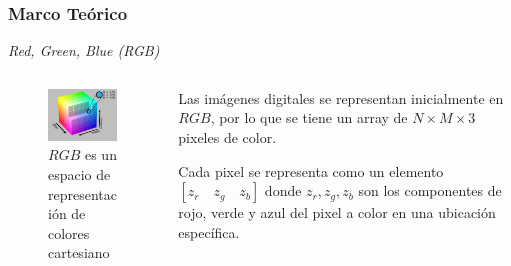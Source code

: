 \documentclass[usenames,dvipsnames]{beamer}
\begin{document}



\begin{frame} 
\frametitle{Marco Teórico} 
\begin{exampleblock}{\textit{Red, Green, Blue (RGB)}}
\end{exampleblock}

\begin{columns}[onlytextwidth]
\begin{column}{.45\textwidth}
\begin{figure}
  \includegraphics[width=4.5cm]{graphics/RGB_Cube_Show_lowgamma_cutout_b.png}
  \caption{$RGB$ es un espacio de representación de colores cartesiano}
\end{figure}
\end{column}
\hfill
\begin{column}{.45\textwidth}
             	
				Las imágenes digitales se representan inicialmente en $RGB$, por lo que se tiene un array de $N \times M \times 3$ pixeles de color.

				Cada pixel se representa como un elemento $[z_r \quad z_g \quad z_b]$ donde $z_r,z_g,z_b$ son los componentes de rojo, verde y azul del pixel a color en una ubicación específica.
\end{column}
\end{columns} 
             	

\end{frame}
\end{document}
